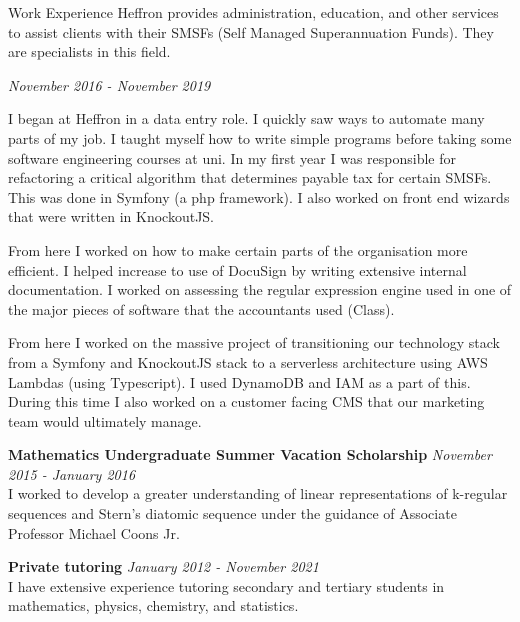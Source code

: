 \documentclass{resume} %
\begin{document}
\begin{rSection}{Work Experience}
    Heffron provides administration, education, and other services to assist clients with their
    SMSFs (Self Managed Superannuation Funds). They are specialists in this field.

    \begin{adjustwidth}{2em}{}
        \begin{rSubsection}{}{\em November 2016 - November 2019}{}{}
            \item
            I began at Heffron in a data entry role. I quickly saw ways to automate many parts of my job.
            I taught myself how to write simple programs before taking some software engineering courses at uni.
            In my first year I was responsible for refactoring a critical algorithm that determines payable
            tax for certain SMSFs. This was done in Symfony (a php framework).
            I also worked on front end wizards that were written in KnockoutJS.

            From here I worked on how to make certain parts of the organisation more efficient. I helped increase
            to use of DocuSign by writing extensive internal documentation.
            I worked on assessing the regular expression engine used in one of the major pieces of software that
            the accountants used (Class).

            From here I worked on the massive project of transitioning our technology stack from a Symfony and KnockoutJS stack to a
            serverless architecture using AWS Lambdas (using Typescript). I used DynamoDB and IAM as a part of this. During this
            time I also worked on a customer facing CMS that our marketing team would ultimately manage.
        \end{rSubsection}
    \end{adjustwidth}

    {\bf Mathematics Undergraduate Summer Vacation Scholarship}
    \hfill {\em November 2015 - January 2016} \\
    I worked to develop a greater understanding of linear representations of k-regular
    sequences and Stern's diatomic sequence under the guidance of Associate Professor Michael Coons Jr.

        {\bf Private tutoring} \hfill {\em January 2012 - November 2021} \\
    I have extensive experience tutoring secondary and tertiary students in mathematics,
    physics, chemistry, and statistics.
\end{rSection}
\end{document}

